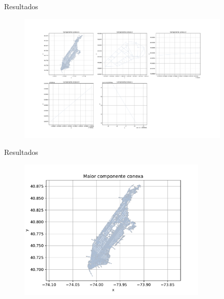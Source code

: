 \documentclass[11pt]{beamer}
\begin{document}
\begin{frame}{Resultados}
    \begin{figure}[htb]
        \label{fig:componentes_conexas}
        \centering
        \includegraphics[width=0.9\textwidth]{../figs/fig2.pdf}
    \end{figure}
\end{frame}

\begin{frame}{Resultados}
    \begin{figure}[htb]
        \label{fig:maior_componente_conexa}
        \centering
        \includegraphics[width=0.8\textwidth]{../figs/fig3.pdf}
    \end{figure}
\end{frame}
\end{document}
